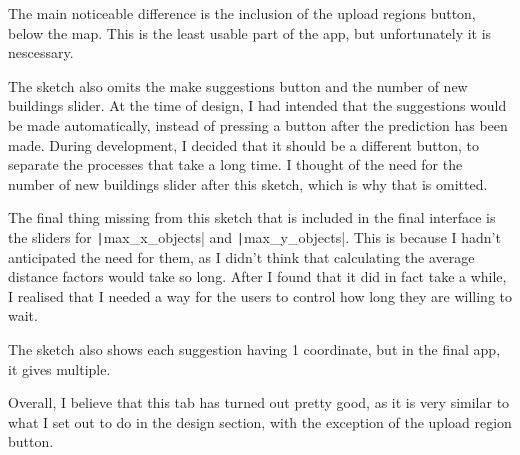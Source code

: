 \documentclass[12pt]{report}
\newcommand{\pil}[1]{\protect\texttt|#1|}
\begin{document}
The main noticeable difference is the inclusion of the upload regions button, below the map. This is the least usable part of the app, but unfortunately it is nescessary.

The sketch also omits the make suggestions button and the number of new buildings slider. At the time of design, I had intended that the suggestions would be made automatically, instead of pressing a button after the prediction has been made. During development, I decided that it should be a different button, to separate the processes that take a long time. I thought of the need for the number of new buildings slider after this sketch, which is why that is omitted.

The final thing missing from this sketch that is included in the final interface is the sliders for \pil{max_x_objects} and \pil{max_y_objects}. This is because I hadn't anticipated the need for them, as I didn't think that calculating the average distance factors would take so long. After I found that it did in fact take a while, I realised that I needed a way for the users to control how long they are willing to wait.

The sketch also shows each suggestion having 1 coordinate, but in the final app, it gives multiple.

Overall, I believe that this tab has turned out pretty good, as it is very similar to what I set out to do in the design section, with the exception of the upload region button.
\end{document}

